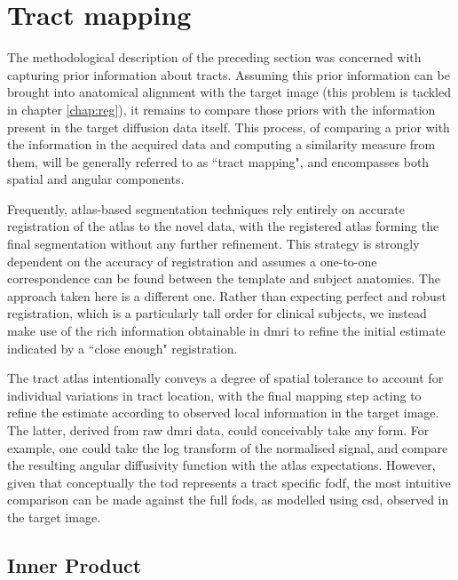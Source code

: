 \section{Tract mapping}
\label{sec:mapping}

The methodological description of the preceding section was concerned with capturing prior information about tracts.
Assuming this prior information can be brought into anatomical alignment with the target image (this problem is tackled in chapter \ref{chap:reg}), it remains to compare those priors with the information present in the target diffusion data itself.
This process, of comparing a prior with the information in the acquired data and computing a similarity measure from them, will be generally referred to as ``tract mapping", and encompasses both spatial and angular components.

Frequently, atlas-based segmentation techniques rely entirely on accurate registration of the atlas to the novel data, with the registered atlas forming the final segmentation without any further refinement.
This strategy is strongly dependent on the accuracy of registration and assumes a one-to-one correspondence can be found between the template and subject anatomies.
The approach taken here is a different one.
Rather than expecting perfect and robust registration, which is a particularly tall order for clinical subjects, we instead make use of the rich information obtainable in \gls{dmri} to refine the initial estimate indicated by a ``close enough" registration.

The tract atlas intentionally conveys a degree of spatial tolerance to account for individual variations in tract location, with the final mapping step acting to refine the estimate according to observed local information in the target image.
The latter, derived from raw \gls{dmri} data, could conceivably take any form.
For example, one could take the log transform of the normalised signal, and compare the resulting angular diffusivity function with the atlas expectations. %
However, given that conceptually the \gls{tod} represents a tract specific \gls{fodf}, the most intuitive comparison can be made against the full \glspl{fod}, as modelled using \gls{csd}, observed in the target image.

\subsection{Inner Product}\label{sec:ip}

